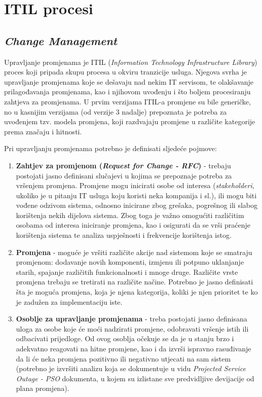 \documentclass[12pt,a4paper]{article}
\begin{document}


\tableofcontents

\newpage


\section{ITIL procesi}

\subsection{\textit{Change Management}}

\quad Upravljanje promjenama je ITIL (\textit{Information Technology Infrastructure Library}) proces koji pripada skupu procesa u okviru tranzicije usluga. Njegova svrha je upravljanje promjenama koje se dešavaju nad nekim IT servisom, te olakšavanje prilagođavanja promjenama, kao i njihovom uvođenju i što boljem procesiranju zahtjeva za promjenama. U prvim verzijama ITIL-a promjene su bile generičke, no u kasnijim verzijama (od verzije 3 nadalje) prepoznata je potreba za uvođenjem tzv. modela promjena, koji razdvajaju promjene u različite kategorije prema značaju i hitnosti.

Pri upravljanju promjenama potrebno je definisati sljedeće pojmove:

\begin{enumerate}
\item \textbf{Zahtjev za promjenom (\textit{Request for Change - RFC})} - trebaju postojati jasno definisani slučajevi u kojima se prepoznaje potreba za vršenjem promjena. Promjene mogu inicirati osobe od interesa (\textit{stakeholderi}, ukoliko je u pitanju IT usluga koju koristi neka kompanija i sl.), ili mogu biti vođene odzivom sistema, odnosno inicirane zbog grešaka, pogrešnog ili slabog korištenja nekih dijelova sistema. Zbog toga je važno omogućiti različitim osobama od interesa iniciranje promjena, kao i osigurati da se vrši praćenje korištenja sistema te analiza uspješnosti i frekvencije korištenja istog.

\item \textbf{Promjena} -  moguće je vršiti različite akcije nad sistemom koje se smatraju promjenom: dodavanje novih komponenti, izmjenu ili potpuno uklanjanje starih, spajanje različitih funkcionalnosti i mnoge druge. Različite vrste promjena trebaju se tretirati na različite načine. Potrebno je jasno definisati šta je moguća promjena, koja je njena kategorija, koliki je njen prioritet te ko je zadužen za implementaciju iste.

\item \textbf{Osoblje za upravljanje promjenama} - treba postojati jasno definisana uloga za osobe koje će moći nadzirati promjene, odobravati vršenje istih ili odbacivati prijedloge. Od ovog osoblja očekuje se da je u stanju brzo i adekvatno reagovati na hitne promjene, kao i da izvrši ispravno rasuđivanje da li će neka promjena pozitivno ili negativno utjecati na sam sistem (potrebno je izvršiti analizu koja se dokumentuje u vidu \textit{Projected Service Outage - PSO} dokumenta, u kojem su izlistane sve predvidljive devijacije od plana promjena).
\end{enumerate}
\end{document}
